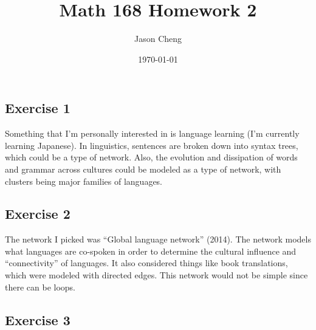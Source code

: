 \documentclass{article}
\title{Math 168 Homework 2}
\author{Jason Cheng}
\date{\today}
\begin{document}
\maketitle

\subsection*{Exercise 1}

Something that I'm personally interested in is language learning (I'm currently
learning Japanese). In linguistics, sentences are broken down into syntax trees,
which could be a type of network. Also, the evolution and dissipation of words
and grammar across cultures could be modeled as a type of network, with clusters
being major families of languages.

\newpage

\subsection*{Exercise 2}

The network I picked was ``Global language network'' (2014). The network models
what languages are co-spoken in order to determine the cultural influence and
``connectivity'' of languages. It also considered things like book translations,
which were modeled with directed edges. This network would not be simple since
there can be loops.

\newpage

\subsection*{Exercise 3}
\end{document}
